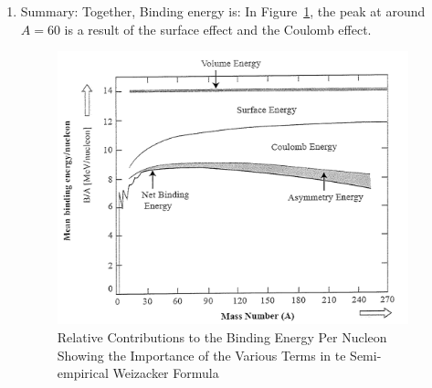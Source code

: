 \documentclass{school-22.101-notes}
\begin{document}
\begin{enumerate}
\begin{enumerate}
    \item Summary: Together, Binding energy is:
    In Figure~\ref{binding-effect}, the peak at around $A = 60$ is a result of the surface effect and the Coulomb effect. 
    \begin{figure}
        \centering
        \includegraphics[width=4in]{images/rd/binding-effect.png}
        \caption{Relative Contributions to the Binding Energy Per Nucleon Showing the Importance of the Various Terms in te Semi-empirical Weizacker Formula \label{binding-effect}}
    \end{figure}
\end{enumerate}

\end{enumerate}
\end{document}

